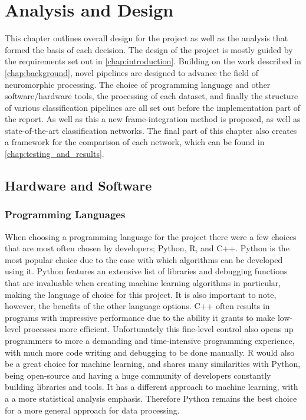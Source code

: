 \chapter{Analysis and Design} \label{chap:analysis_and_design}

This chapter outlines overall design for the project as well as the analysis that formed the basis of each decision. The design of the project is mostly guided by the requirements set out in \cref{chap:introduction}. Building on the work described in \cref{chap:background}, novel pipelines are designed to advance the field of neuromorphic processing. The choice of programming language and other software/hardware tools, the processing of each dataset, and finally the structure of various classification pipelines are all set out before the implementation part of the report. As well as this a new frame-integration method is proposed, as well as state-of-the-art classification networks. The final part of this chapter also creates a framework for the comparison of each network, which can be found in \cref{chap:testing_and_results}.

\section{Hardware and Software}

\subsection{Programming Languages}

When choosing a programming language for the project there were a few choices that are most often chosen by developers; Python\cite{Python}, R\cite{R}, and C++\cite{C++}. Python is the most popular choice due to the ease with which algorithms can be developed using it. Python features an extensive list of libraries and debugging functions that are invaluable when creating machine learning algorithms in particular, making the language of choice for this project. It is also important to note, however, the benefits of the other language options. C++ often results in programs with impressive performance due to the ability it grants to make low-level processes more efficient. Unfortunately this fine-level control also opens up programmers to more a demanding and time-intensive programming experience, with much more code writing and debugging to be done manually. R would also be a great choice for machine learning, and shares many similarities with Python, being open-source and having a huge community of developers constantly building libraries and tools. It has a different approach to machine learning, with a a more statistical analysis emphasis. Therefore Python remains the best choice for a more general approach for data processing.

